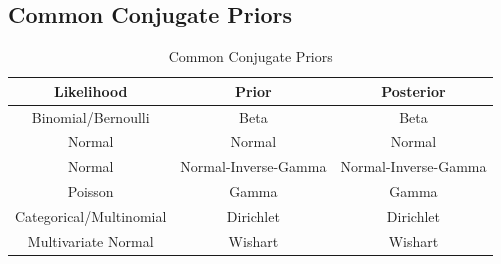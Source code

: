 \documentclass[12pt,a4paper]{article}
\begin{document}
\subsection{Common Conjugate Priors}
\begin{table}[h!]
    \centering
    \begin{tabular}{c|c|c}
         Likelihood & Prior & Posterior  \\
         \midrule
         Binomial/Bernoulli & Beta & Beta \\
         Normal & Normal & Normal\\
         Normal & Normal-Inverse-Gamma &Normal-Inverse-Gamma\\
         Poisson &Gamma &Gamma\\
         Categorical/Multinomial & Dirichlet & Dirichlet \\
         Multivariate Normal & Wishart & Wishart \\
    \end{tabular}
    \caption{Common Conjugate Priors}
    \label{tab:my_label}
\end{table}
\end{document}
